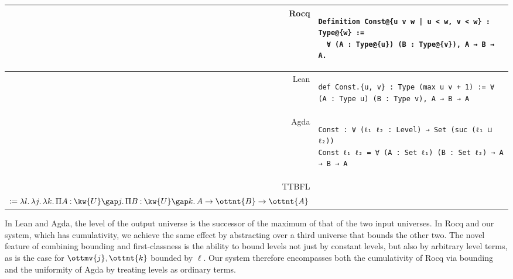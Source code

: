 \documentclass[a4paper,UKenglish,cleveref,autoref,thm-restate]{lipics-v2021}
\makeatletter
\newcommand{\lang}{TTBFL\@\xspace}
\makeatother
\begin{document}
\begin{table}[H]
\begin{tabular}{rp{}}
  Rocq &
  \begin{minipage}[t]{0.83\textwidth}
  \begin{verbatim}
Definition Const@{u v w | u < w, v < w} : Type@{w} :=
  ∀ (A : Type@{u}) (B : Type@{v}), A → B → A.
  \end{verbatim}
  \end{minipage}
  \\
  \midrule
  Lean &
  \begin{minipage}[t]{0.83\textwidth}
  \begin{verbatim}
def Const.{u, v} : Type (max u v + 1) := ∀ (A : Type u) (B : Type v), A → B → A
  \end{verbatim}
  \end{minipage}
  \\
  \midrule
  Agda &
  \begin{minipage}[t]{0.83\textwidth}
  \begin{verbatim}
Const : ∀ (ℓ₁ ℓ₂ : Level) → Set (suc (ℓ₁ ⊔ ℓ₂))
Const ℓ₁ ℓ₂ = ∀ (A : Set ℓ₁) (B : Set ℓ₂) → A → B → A
  \end{verbatim}
  \end{minipage}
  \\
  \midrule
  \lang &
  \begin{minipage}[t]{0.83\textwidth}
  $\kw{Const} :  \Pi  l  \mathbin{:}   \kw{Level}\texttt{<} \gap   \omega    \mathpunct{.}   \Pi  j  \mathbin{:}   \kw{Level}\texttt{<} \gap  l   \mathpunct{.}   \Pi  k  \mathbin{:}   \kw{Level}\texttt{<} \gap  l   \mathpunct{.}   \kw{U} \gap  l    $ \\
  \phantom{$\kw{Const}$} $\coloneq    \lambda  l  \mathpunct{.}   \lambda  j  \mathpunct{.}   \lambda  k  \mathpunct{.}   \Pi  A  \mathbin{:}   \kw{U} \gap  j   \mathpunct{.}   \Pi  B  \mathbin{:}   \kw{U} \gap  k   \mathpunct{.}  A       \to  \ottnt{B}   \to  \ottnt{A} $
  \end{minipage}
\end{tabular}
\end{table}

In Lean and Agda, the level of the output universe is
the successor of the maximum of that of the two input universes.
In Rocq and our system, which has cumulativity,
we achieve the same effect by abstracting over a third universe that bounds the other two.
The novel feature of combining bounding and first-classness
is the ability to bound levels not just by constant levels,
but also by arbitrary level terms, as is the case for $\ottmv{j}, \ottnt{k}$ bounded by $\ell$.
Our system therefore encompasses both the cumulativity of Rocq via bounding
and the uniformity of Agda by treating levels as ordinary terms.
\end{document}
